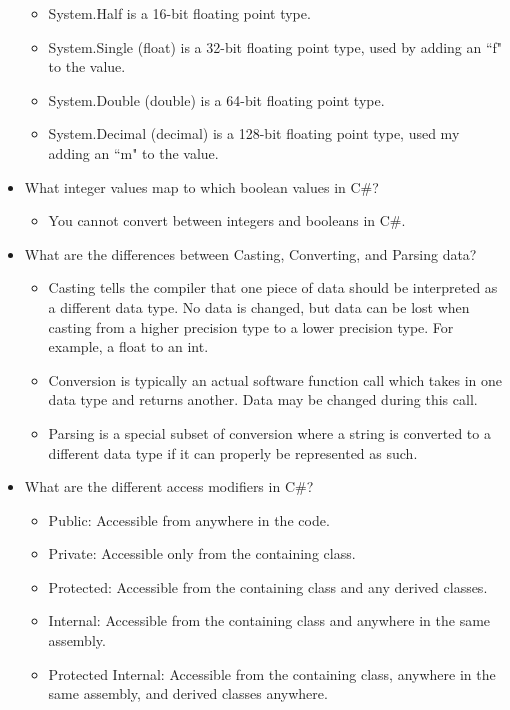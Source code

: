\documentclass{article}
\begin{document}
\begin{itemize}
\begin{itemize}
        \item System.Half is a 16-bit floating point type.
        \item System.Single (float) is a 32-bit floating point type, used by adding an ``f" to the value.
        \item System.Double (double) is a 64-bit floating point type.
        \item System.Decimal (decimal) is a 128-bit floating point type, used my adding an ``m" to the value.
    \end{itemize}
    \item What integer values map to which boolean values in C\#?
    \begin{itemize}
        \item You cannot convert between integers and booleans in C\#.
    \end{itemize}
    \item What are the differences between Casting, Converting, and Parsing data?
    \begin{itemize}
        \item Casting tells the compiler that one piece of data should be interpreted as a different data type. No data is changed, but data can be lost when casting from a higher precision type to a lower precision type. For example, a float to an int.
        \item Conversion is typically an actual software function call which takes in one data type and returns another. Data may be changed during this call.
        \item Parsing is a special subset of conversion where a string is converted to a different data type if it can properly be represented as such.
    \end{itemize}
    \item What are the different access modifiers in C\#?
    \begin{itemize}
        \item Public: Accessible from anywhere in the code.
        \item Private: Accessible only from the containing class.
        \item Protected: Accessible from the containing class and any derived classes.
        \item Internal: Accessible from the containing class and anywhere in the same assembly.
        \item Protected Internal: Accessible from the containing class, anywhere in the same assembly, and derived classes anywhere.

\end{itemize}
\end{itemize}
\end{document}
